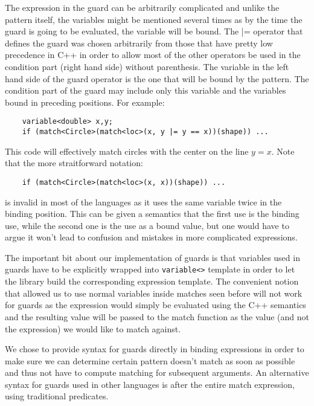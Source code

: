 \documentclass[preprint]{sigplanconf}
\DeclareRobustCommand{\code}[1]{{\lstinline[breaklines=false]{#1}}}
\begin{document}
The expression in the guard can be arbitrarily complicated and unlike the 
pattern itself, the variables might be mentioned several times as by the time 
the guard is going to be evaluated, the variable will be bound. The |= operator 
that defines the guard was chosen arbitrarily from those that have pretty low 
precedence in C++ in order to allow most of the other operators be used in the 
condition part (right hand side) without parenthesis. The variable in the left 
hand side of the guard operator is the one that will be bound by the pattern. 
The condition part of the guard may include only this variable and the variables 
bound in preceding positions. For example:

\begin{lstlisting}
    variable<double> x,y;
    if (match<Circle>(match<loc>(x, y |= y == x))(shape)) ...
\end{lstlisting}

This code will effectively match circles with the center on the line $y=x$. Note 
that the more straitforward notation:

\begin{lstlisting}
    if (match<Circle>(match<loc>(x, x))(shape)) ...
\end{lstlisting}

is invalid in most of the languages as it uses the same variable twice in the 
binding position. This can be given a semantics that the first use is the 
binding use, while the second one is the use as a bound value, but one would 
have to argue it won't lead to confusion and mistakes in more complicated 
expressions.

The important bit about our implementation of guards is that variables used in 
guards have to be explicitly wrapped into \code{variable<>} template in order to let 
the library build the corresponding expression template. The convenient notion 
that allowed us to use normal variables inside matches seen before will not work 
for guards as the expression would simply be evaluated using the C++ semantics 
and the resulting value will be passed to the match function as the value (and 
not the expression) we would like to match against.

We chose to provide syntax for guards directly in binding expressions in order 
to make sure we can determine certain pattern doesn't match as soon as possible 
and thus not have to compute matching for subsequent arguments. An alternative 
syntax for guards used in other languages is after the entire match expression, 
using traditional predicates.
\end{document}
